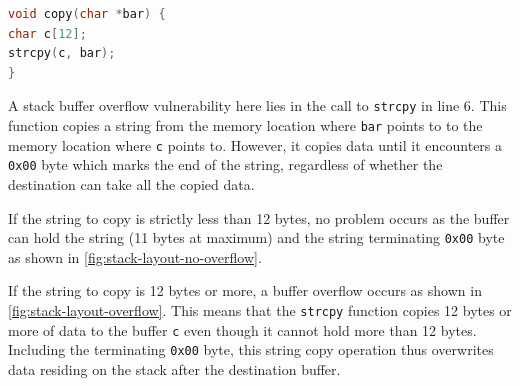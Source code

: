 \begin{lstlisting}[language=C,float=ht,caption={C function with buffer overflow vulnerability}, label={lst:vulnerable-function}]
void copy(char *bar) {
char c[12];
strcpy(c, bar);
}
\end{lstlisting}

A stack buffer overflow vulnerability here lies in the call to \texttt{strcpy} in line 6.
This function copies a string from the memory location where \texttt{bar} points to to the memory location where \texttt{c} points to.
However, it copies data until it encounters a \texttt{0x00} byte which marks the end of the string, regardless of whether the destination can take all the copied data.

If the string to copy is strictly less than 12 bytes, no problem occurs as the buffer can hold the string (11 bytes at maximum) and the string terminating \texttt{0x00} byte as shown in \cref{fig:stack-layout-no-overflow}.

If the string to copy is 12 bytes or more, a buffer overflow occurs as shown in \cref{fig:stack-layout-overflow}.
This means that the \texttt{strcpy} function copies 12 bytes or more of data to the buffer \texttt{c} even though it cannot hold more than 12 bytes.
Including the terminating \texttt{0x00} byte, this string copy operation thus overwrites data residing on the stack after the destination buffer.

